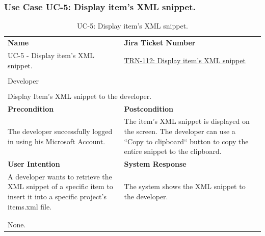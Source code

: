 \subsubsection{Use Case UC-5: Display item's XML snippet.}\label{subsubsec:use-case-uc-5:-display-item's-xml-snippet}

\begin{table}[H]
    \centering
    \begin{tabular}{|p{}|p{}|}

        \hline
        \rowcolor{gray!50}\textbf{Name} & \textbf{Jira Ticket Number} \\
        UC-5 - Display item's XML snippet.
        &
        \href{https://fh-burgenland.atlassian.net/browse/TRN-112}{TRN-112: Display item's XML snippet} \\ \hline

        \rowcolor{gray!50}\multicolumn{2}{|l|}{\textbf{User Role}} \\
        \multicolumn{2}{|l|}{Developer} \\ \hline

        \rowcolor{gray!50}\multicolumn{2}{|l|}{\textbf{Purpose}} \\
        \multicolumn{2}{|l|}{Display Item's XML snippet to the developer.} \\ \hline

        \rowcolor{gray!50}\textbf{Precondition} & \textbf{Postcondition} \\
        The developer successfully logged in using his Microsoft Account.
        &
        The item's XML snippet is displayed on the screen. The developer can use a ``Copy to clipboard`` button to copy the entire snippet to the clipboard.\\ \hline

        \rowcolor{gray!50}\textbf{User Intention} & \textbf{System Response} \\
        A developer wants to retrieve the XML snippet of a specific item to insert it into a specific project's items.xml file.
        &
        The system shows the XML snippet to the developer. \\ \hline

        \multicolumn{2}{|c|}{} \\ \hline

        \rowcolor{gray!50}\multicolumn{2}{|l|}{\textbf{Remarks}} \\
        \multicolumn{2}{|p{\textwidth}|}{None.} \\ \hline
    \end{tabular}
    \caption{UC-5: Display item's XML snippet.}
    \label{tab:uc-5_xml_snippet}
\end{table}



